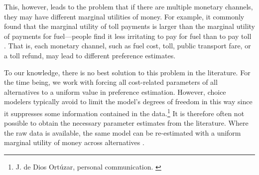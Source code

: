 This, however, leads to the problem that if there are multiple monetary channels, they may have different marginal utilities of money.  For example, it commonly found that the marginal utility of toll payments is larger than the marginal utility of payments for fuel---\ie people find it less irritating to pay for fuel than to pay toll 
%
%
\citep[see, e.g.,][]{VrticEtc2008ReisekostenSVIBericht}.
%
That is, each monetary channel, such as fuel cost, toll, public transport fare, or a toll refund, may lead to different preference estimates.

To our knowledge, there is no best solution to this problem in the literature.  For the time being, we work with forcing all cost-related parameters of all alternatives to a uniform value in preference estimation.
%
However, choice modelers typically avoid to limit the model's degrees of freedom in this way since it suppresses some information contained in the data.\footnote{%
%
J. de Dios Ort\'uzar, personal communication.
%
\label{fn:ortuzar-pers-com}}
%
It is therefore often not possible to obtain the necessary parameter estimates from the literature. Where the raw data is available, the same model can be re-estimated with a uniform marginal utility of money across alternatives
\citep[see, e.g.,][]{KickhoeferEtAl_Transportation_2011, TirachiniEtAl2012CrowdingCongestion}.

